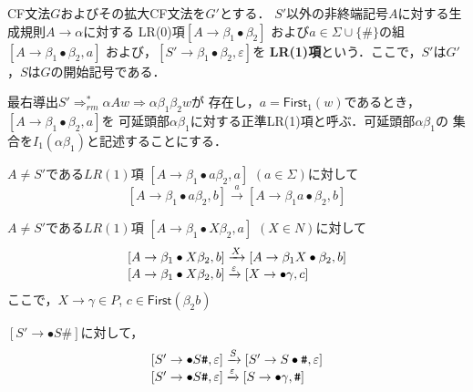 \documentclass[a4j,dvipdfmx]{jbook}
\begin{document}
\begin{Def}
  CF文法$G$およびその拡大CF文法を$G'$とする．
  $S'$以外の非終端記号$A$に対する生成規則$A\rightarrow\alpha$に対する
  LR(0)項$[A\rightarrow\beta_1\bullet\beta_2]$
  および$a\in\Sigma\cup\{\texttt{\#}\}$の組$[A\rightarrow\beta_1\bullet\beta_2,a]$
  および，$[S'\rightarrow\beta_1\bullet\beta_2,\varepsilon]$を
  {\bf LR(1)項}という．ここで，$S'$は$G'$，$S$は$G$の開始記号である．
\end{Def}

\begin{Def}
  最右導出$S'\Rightarrow^\ast_{rm}\alpha A w\Rightarrow \alpha\beta_1\beta_2 w$が
  存在し，$a=\mathsf{First}_1(w)$であるとき，$[A\rightarrow\beta_1\bullet\beta_2,a]$を
  可延頭部$\alpha\beta_1$に対する正準LR(1)項と呼ぶ．可延頭部$\alpha\beta_1$の
  集合を$I_1(\alpha\beta_1)$と記述することにする．
\end{Def}

\begin{Def}
  \begin{list}{}{}
    \item[(1)] $A\not=S'$である$LR(1)$項 $[A\rightarrow\beta_1\bullet a\beta_2,a]$ $(a\in\Sigma)$に対して
          \[[A\rightarrow\beta_1\bullet a\beta_2,b]\xrightarrow{a}[A\rightarrow\beta_1 a\bullet\beta_2,b]\]
    \item[(2)] $A\not=S'$である$LR(1)$項 $[A\rightarrow\beta_1\bullet X\beta_2,a]$ $(X\in N)$に対して
          \[\begin{array}{l}
              [A\rightarrow\beta_1\bullet X\beta_2,b]\xrightarrow{X}[A\rightarrow\beta_1 X\bullet\beta_2,b] \\\relax
              [A\rightarrow\beta_1\bullet X\beta_2,b]\xrightarrow{\varepsilon}[X\rightarrow\bullet\gamma,c]
            \end{array}\]
          ここで，$X\rightarrow\gamma\in P$, $c\in\mathsf{First}(\beta_2 b)$
    \item[(3)] $[S'\rightarrow\bullet S\texttt{\#}]$に対して，
          \[\begin{array}{l}
              [S'\rightarrow\bullet S\texttt{\#},\varepsilon]\xrightarrow{S}[S'\rightarrow S\bullet\texttt{\#},\varepsilon] \\\relax
              [S'\rightarrow\bullet S\texttt{\#},\varepsilon]\xrightarrow{\varepsilon}
              [S\rightarrow\bullet\gamma,\texttt{\#}]
            \end{array}\]
  \end{list}
\end{Def}
\end{document}
